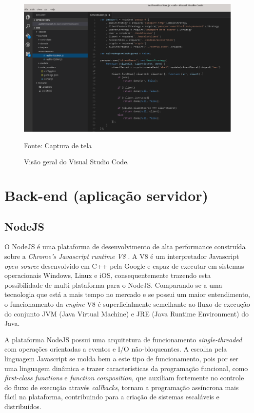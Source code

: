 \begin{figure}[H]
	\centering
	\includegraphics[scale=0.52]{imagens/visualstudio_code.png}
	\caption{\small Visão geral do Visual Studio Code.} Fonte: Captura de tela
	\label{fig:vscode}
\end{figure}

\section{Back-end (aplicação servidor)}
\subsection{NodeJS}
O NodeJS \cite{nodejs} é uma plataforma de desenvolvimento de alta performance construída sobre a \textit{Chrome's Javascript runtime V8} \cite{v8}. A V8 é um interpretador Javascript \textit{open source} desenvolvido em C++ pela Google e capaz de executar em sistemas operacionais Windows, Linux e iOS, consequentemente trazendo esta possibilidade de multi plataforma para o NodeJS. Comparando-se a uma tecnologia que está a mais tempo no mercado e se possui um maior entendimento, o funcionamento da \textit{engine} V8 é superficialmente semelhante ao fluxo de execução do conjunto JVM (Java Virtual Machine) e JRE (Java Runtime Environment) do Java.

A plataforma NodeJS possui uma arquitetura de funcionamento \textit{single-threaded} com operações orientadas a eventos e I/O não-bloqueantes. A escolha pela linguagem Javascript se molda bem a este tipo de funcionamento, pois por ser uma linguagem dinâmica e trazer características da programação funcional, como \textit{first-class functions} e \textit{function composition}, que auxiliam fortemente no controle do fluxo de execução através \textit{callbacks}, tornam a programação assíncrona mais fácil na plataforma, contribuindo para a criação de sistemas escaláveis e distribuídos.

